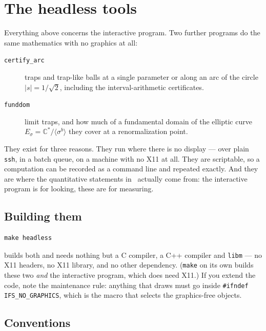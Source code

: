 \documentclass{amsart}
\begin{document}
\section{The headless tools}

Everything above concerns the interactive program.  Two further programs do the same
mathematics with no graphics at all:

\begin{description}
\item[\texttt{certify\_arc}] traps and trap-like balls at a single parameter or along an arc of
the circle $|s| = 1/\sqrt2$, including the interval-arithmetic certificates.
\item[\texttt{funddom}] limit traps, and how much of a fundamental domain of the elliptic curve
$E_\sigma = \mathbb{C}^*/\langle\sigma^b\rangle$ they cover at a renormalization point.
\end{description}

They exist for three reasons.  They run where there is no display --- over plain \texttt{ssh}, in
a batch queue, on a machine with no X11 at all.  They are scriptable, so a computation can be
recorded as a command line and repeated exactly.  And they are where the quantitative statements
in~\cite{paper} actually come from: the interactive program is for looking, these are for
measuring.

\subsection{Building them}

\begin{verbatim}
make headless
\end{verbatim}

builds both and needs nothing but a C compiler, a C++ compiler and \texttt{libm} --- no X11
headers, no X11 library, and no other dependency.  (\texttt{make} on its own builds these two
\emph{and} the interactive program, which does need X11.)  If you extend the code, note the
maintenance rule: anything that draws must go inside \texttt{\#ifndef IFS\_NO\_GRAPHICS}, which
is the macro that selects the graphics-free objects.

\subsection{Conventions}
\end{document}
